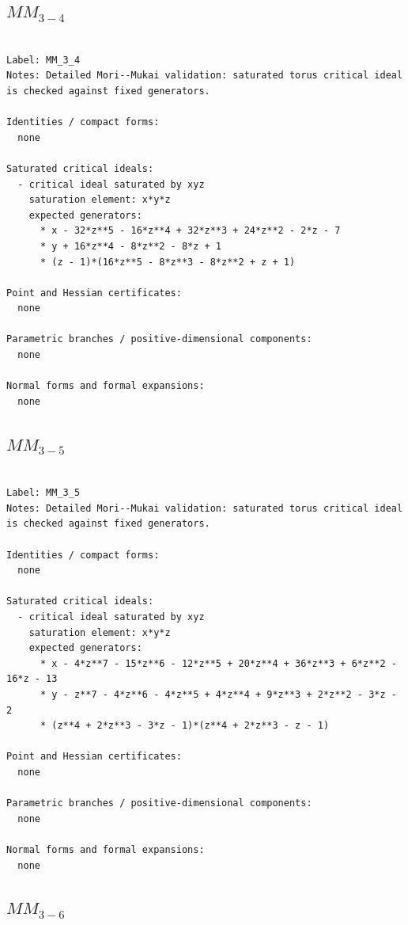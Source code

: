 \documentclass[10pt,a4paper]{article}
\begin{document}
\subsection*{$ MM_{3-4} $}

\begin{lstlisting}

Label: MM_3_4
Notes: Detailed Mori--Mukai validation: saturated torus critical ideal is checked against fixed generators.

Identities / compact forms:
  none

Saturated critical ideals:
  - critical ideal saturated by xyz
    saturation element: x*y*z
    expected generators:
      * x - 32*z**5 - 16*z**4 + 32*z**3 + 24*z**2 - 2*z - 7
      * y + 16*z**4 - 8*z**2 - 8*z + 1
      * (z - 1)*(16*z**5 - 8*z**3 - 8*z**2 + z + 1)

Point and Hessian certificates:
  none

Parametric branches / positive-dimensional components:
  none

Normal forms and formal expansions:
  none

\end{lstlisting}

\subsection*{$ MM_{3-5} $}

\begin{lstlisting}

Label: MM_3_5
Notes: Detailed Mori--Mukai validation: saturated torus critical ideal is checked against fixed generators.

Identities / compact forms:
  none

Saturated critical ideals:
  - critical ideal saturated by xyz
    saturation element: x*y*z
    expected generators:
      * x - 4*z**7 - 15*z**6 - 12*z**5 + 20*z**4 + 36*z**3 + 6*z**2 - 16*z - 13
      * y - z**7 - 4*z**6 - 4*z**5 + 4*z**4 + 9*z**3 + 2*z**2 - 3*z - 2
      * (z**4 + 2*z**3 - 3*z - 1)*(z**4 + 2*z**3 - z - 1)

Point and Hessian certificates:
  none

Parametric branches / positive-dimensional components:
  none

Normal forms and formal expansions:
  none

\end{lstlisting}

\subsection*{$ MM_{3-6} $}
\end{document}
